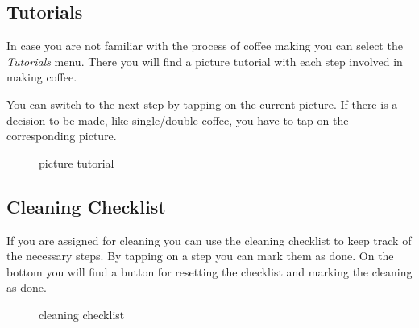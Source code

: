 \subsection{Tutorials}\label{tutorials-1}

In case you are not familiar with the process of coffee making you can
select the \emph{Tutorials} menu. There you will find a picture tutorial
with each step involved in making coffee.

You can switch to the next step by tapping on the current picture. If
there is a decision to be made, like single/double coffee, you have to
tap on the corresponding picture.

\begin{figure}[htbp]
\centering
{}
\caption{picture tutorial}
\end{figure}

\subsection{Cleaning Checklist}\label{cleaning-checklist-1}

If you are assigned for cleaning you can use the cleaning checklist to
keep track of the necessary steps. By tapping on a step you can mark
them as done. On the bottom you will find a button for resetting the
checklist and marking the cleaning as done.

\begin{figure}[htbp]
\centering
{}
\caption{cleaning checklist}
\end{figure}

